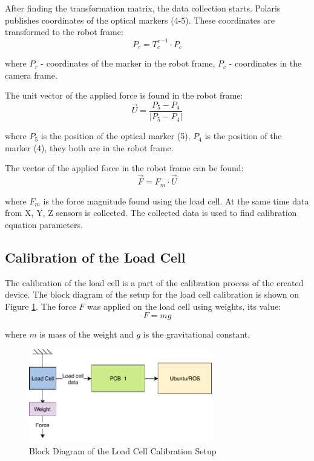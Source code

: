 	After finding the transformation matrix, the data collection starts. Polaris publishes coordinates of the optical markers (4-5). These coordinates are transformed to the robot frame:
\begin{equation}
P_{r} = {T_{c}^{ r}}^{-1} \cdot P_{c}
\end{equation}

	where $P_{r}$ - coordinates of the marker in the robot frame, $P_{c}$ - coordinates in the camera frame.
	
	The unit vector of the applied force is found in the robot frame:
\begin{equation}
\vec{U} = \frac{P_{5} - P_{4}}{|P_{5} - P_{4}|}
\end{equation}
	
	where $P_{5}$ is the position of the optical marker (5), $P_{4}$ is the position of the marker (4), they both are in the robot frame.
	
	The vector of the applied force in the robot frame can be found:
\begin{equation}
\vec{F} = F_{m} \cdot \vec{U}
\end{equation}

	where $F_{m}$ is the force magnitude found using the load cell.
	At the same time data from X, Y, Z sensors is collected. The collected data is used to find calibration equation parameters.
	
	\subsection{Calibration of the Load Cell}
	\label{sec:CalLoadCell}
	The calibration of the load cell is a part of the calibration process of the created device. The block diagram of the setup for the load cell calibration is shown on Figure \ref{fig:Calib_setup_LC}. The force $F$ was applied on the load cell using weights, its value: 
\begin{equation}
F = mg
\end{equation}

	where $m$ is mass of the weight and $g$ is the gravitational constant.

\begin{figure}[h]
	\begin{center}
	\includegraphics[width=80mm]{fig/methods/Load_Cell_Calibration.pdf}
	\end{center}
	\vspace{-4mm}
	\caption[Block Diagram of the Load Cell Calibration Setup]
	{Block Diagram of the Load Cell Calibration Setup}
	\label{fig:Calib_setup_LC}
	\vspace{-2mm}
\end{figure}

